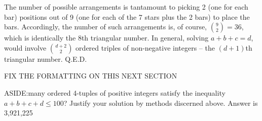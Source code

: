 The number of possible arrangements is tantamount to picking 2 (one for each bar) positions out of 9 (one for each of the 7 stars plus the 2 bars) to place the bars. Accordingly, the number of such arrangements is, of course, \(\binom{9}{2} = 36\), which is identically the 8th triangular number. In general, solving \(a + b + c = d\), would involve \(\binom{d+2}{2}\) ordered triples of non-negative integers – the \((d + 1)\)th triangular number. Q.E.D.


\begin{center}
FIX THE FORMATTING ON THIS NEXT SECTION
\end{center}

ASIDE:\@How many ordered 4-tuples of positive integers satisfy the inequality \(a + b + c + d \leq 100\)? Justify your solution by methods discerned above.                                                                                  Answer is 3,921,225 